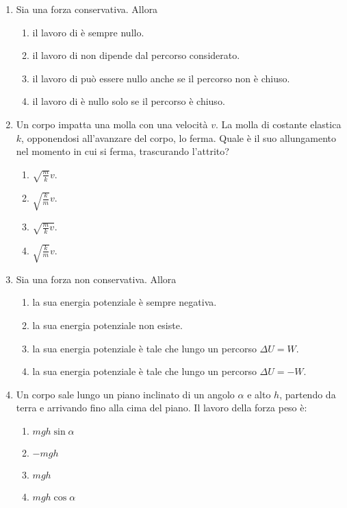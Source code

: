 \documentclass{article}
\begin{document}
\begin{enumerate}
  \item Sia  una forza conservativa. Allora
  \begin{enumerate}[label=\Alph*.]
    \item il lavoro di  è sempre nullo.
    \item il lavoro di  non dipende dal percorso considerato.
    \item il lavoro di  può essere nullo anche se il percorso non è chiuso.
    \item il lavoro di  è nullo solo se il percorso è chiuso.
  \end{enumerate}
  \item Un corpo impatta una molla con una velocità $v$. La molla di costante elastica $k$, opponendosi all'avanzare del corpo, lo ferma. Quale è il suo allungamento nel momento in cui si ferma, trascurando l'attrito?
  \begin{enumerate}[label=\Alph*.]
    \item $\sqrt{\frac{m}{k}}v$.
    \item $\sqrt{\frac{k}{m}}v$.
    \item $\sqrt{\frac{m}{k}v}$.
    \item $\sqrt{\frac{k}{m}}v$.
  \end{enumerate}
  \item Sia  una forza non conservativa. Allora
  \begin{enumerate}[label=\Alph*.]
    \item la sua energia potenziale è sempre negativa.
    \item la sua energia potenziale non esiste.
    \item la sua energia potenziale è tale che lungo un percorso $\Delta U=W$.
    \item la sua energia potenziale è tale che lungo un percorso $\Delta U=-W$.
  \end{enumerate}
  \item Un corpo sale lungo un piano inclinato di un angolo $\alpha$ e alto $h$, partendo da terra e arrivando fino alla cima del piano. Il lavoro della forza peso è:
  \begin{enumerate}[label=\Alph*.]
    \item $mgh\sin\alpha$
    \item $-mgh$
    \item $mgh$
    \item $mgh\cos\alpha$
  \end{enumerate}

\end{enumerate}
\end{document}
